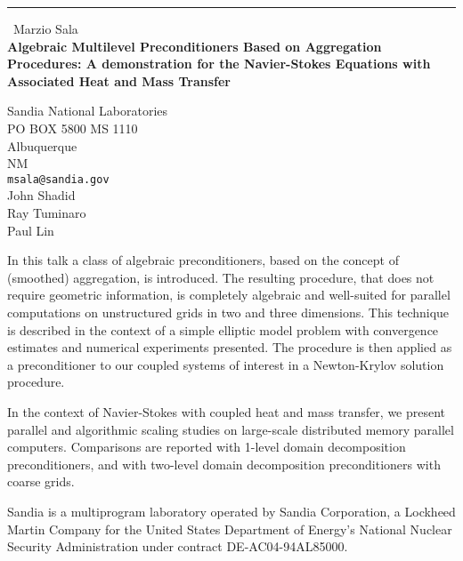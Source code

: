 \documentclass{report}
\begin{document}
\begin{center}
\rule{6in}{1pt} \
{\large Marzio Sala \\
{\bf Algebraic Multilevel Preconditioners Based on Aggregation Procedures: A demonstration for the Navier-Stokes Equations with Associated Heat and Mass Transfer}}

Sandia National Laboratories \\ PO BOX 5800 MS 1110 \\ Albuquerque \\ NM
\\
{\tt msala@sandia.gov}\\
John Shadid\\
Ray Tuminaro\\
	Paul Lin\end{center}

In this talk a class of algebraic preconditioners, based on the concept
of (smoothed) aggregation, is introduced. The resulting
procedure, that does not require geometric information, is completely
algebraic and well-suited for parallel computations on unstructured grids
in two and three dimensions. This technique is described in the context
of a simple elliptic model problem with convergence estimates and
numerical experiments presented. The procedure is then applied as a
preconditioner to our coupled systems of interest in a Newton-Krylov
solution procedure.

In the context of Navier-Stokes with coupled heat and mass transfer, we
present parallel and algorithmic scaling studies on large-scale
distributed memory parallel computers. Comparisons are reported with
1-level domain decomposition preconditioners, and with two-level domain
decomposition preconditioners with coarse grids.

Sandia is a multiprogram laboratory operated by Sandia Corporation, a
Lockheed Martin Company for the United States Department of Energy's
National Nuclear Security Administration under contract
DE-AC04-94AL85000.
\end{document}
